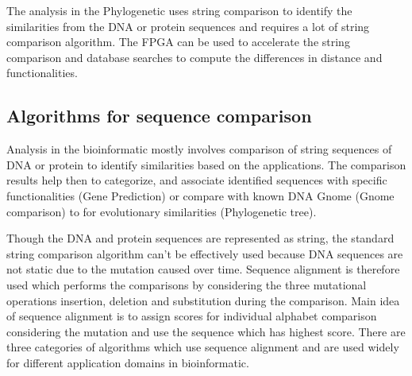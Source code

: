 \documentclass[12pt,twoside]{article}
\begin{document}
The analysis in the Phylogenetic uses string comparison to identify the similarities from the DNA or protein sequences and
requires a lot of string comparison algorithm. The FPGA can be used to accelerate the string comparison and database searches
to compute the differences in distance and functionalities.

\subsection{Algorithms for sequence comparison}

Analysis in the bioinformatic mostly involves comparison of string sequences of DNA or protein
to identify similarities based on the applications. The comparison results help then to categorize,
and associate identified sequences with specific functionalities (Gene Prediction) or compare with
known DNA Gnome (Gnome comparison) to for evolutionary similarities (Phylogenetic tree).

Though the DNA and protein sequences are represented as string, the standard string comparison algorithm
can't be effectively used because DNA sequences are not static due to the mutation caused over time.
Sequence alignment is therefore used which performs the comparisons by considering the three
mutational operations insertion, deletion and substitution during the comparison. Main idea of sequence
alignment is to assign scores for individual alphabet comparison considering the mutation and use the
sequence which has highest score. There are three categories of algorithms which use sequence alignment
and are used widely for different application domains in bioinformatic.
\end{document}
